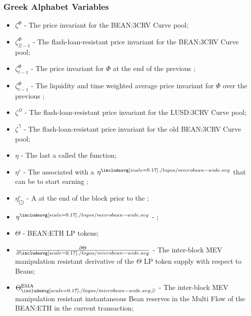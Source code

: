 \documentclass[class=article, crop=false]{standalone}
\begin{document}
\subsubsection{Greek Alphabet Variables}

\begin{itemize}[topsep=0pt, itemsep=3pt,leftmargin=16pt]
    \item[] $\zeta^{\Phi}$ - \hypertarget{ht95}{The price invariant for the BEAN:3CRV Curve pool};
    \item[] $\zeta^{\Phi}_{\Xi-1}$ - \hypertarget{ht96}{The flash-loan-resistant price invariant for the BEAN:3CRV Curve pool};
    \item[] $\zeta^{\Phi}_{t-1}$ - \hypertarget{ht97}{The price invariant for $\Phi$ at the end of the previous };
    \item[] $\zeta^{\Phi}_{\overline{t-1}}$ - \hypertarget{ht98}{The liquidity and time weighted average price invariant for $\Phi$ over the previous };
    \item[] $\zeta^{\Omega}$ - \hypertarget{ht99}{The flash-loan-resistant price invariant for the LUSD:3CRV Curve pool};
    \item[] $\zeta^{\daleth}$ - \hypertarget{ht94}{The flash-loan-resistant price invariant for the old BEAN:3CRV Curve pool};
    \item[] $\eta$ - \hypertarget{ht104}{The last  a  called the  function};
    \item[] $\eta^{c}$ - \hypertarget{ht106}{The   associated with a  $\eta^{\bean}$ that can be  to start earning };
    \item[] $\eta_{\bigodot}^c$ - \hypertarget{ht107}{A    at the end of the block prior to the };
    \item[] $\eta^{\bean}$ - \hypertarget{ht105}{ \Bean};
    \item[] $\Theta$ - BEAN:ETH  LP tokens;
    \item[] $\frac{\partial \Theta}{\partial \bean}$ - The inter-block MEV manipulation resistant derivative of the $\Theta$ LP token supply with respect to Beans;
    \item[] $\Theta^{\text{EMA}}_{\bean,\Game}$ - The inter-block MEV manipulation resistant instantaneous Bean reserves in the Multi Flow  of the BEAN:ETH  in the current transaction;

\end{itemize}
\end{document}
